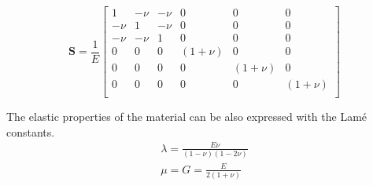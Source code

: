 \documentclass[a4paper, 11pt,article,oneside]{memoir}%
\begin{document}
\begin{eqbox}
\begin{equation*}
\boldsymbol{S}=\frac{1}{E}
\begin{bmatrix}
1&-\nu&-\nu&0&0&0\\
-\nu&1&-\nu&0&0&0\\
-\nu&-\nu&1&0&0&0\\
0&0&0&(1+\nu)&0&0\\
0&0&0&0&(1+\nu)&0\\
0&0&0&0&0&(1+\nu)\\
\end{bmatrix}
\end{equation*}
\end{eqbox}
The elastic properties of the material can be also expressed with the Lamé constants.
\begin{gather*}
\lambda=\frac{E\nu}{(1-\nu)(1-2\nu)}\\
\mu=G=\frac{E}{2(1+\nu)}
\end{gather*}


\newpage
\end{document}
